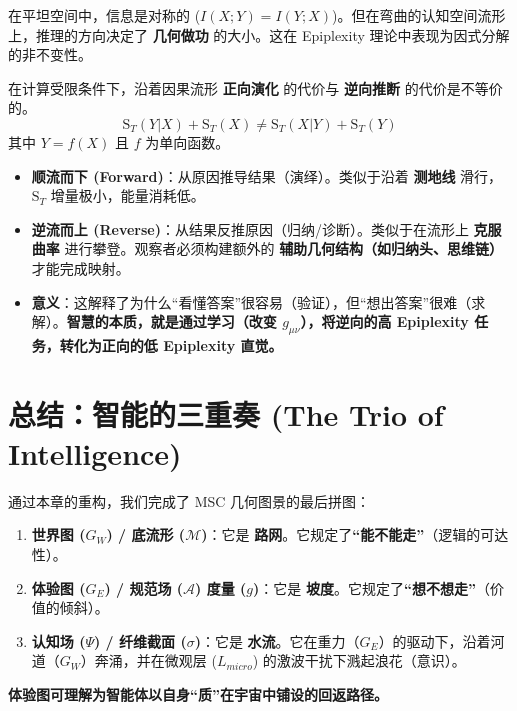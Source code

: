 在平坦空间中，信息是对称的 ($I(X;Y) = I(Y;X)$)。但在弯曲的认知空间流形上，推理的方向决定了 \textbf{几何做功} 的大小。这在 Epiplexity 理论中表现为因式分解的非不变性。

\begin{corollary}[认知不可逆原理]
    在计算受限条件下，沿着因果流形 \textbf{正向演化} 的代价与 \textbf{逆向推断} 的代价是不等价的。
    $$ \mathrm{S}_T(Y | X) + \mathrm{S}_T(X) \neq \mathrm{S}_T(X | Y) + \mathrm{S}_T(Y) $$
    其中 $Y = f(X)$ 且 $f$ 为单向函数。
\end{corollary}


\begin{itemize}
    \item \textbf{顺流而下 (Forward)}：从原因推导结果（演绎）。类似于沿着 \textbf{测地线} 滑行，$\mathrm{S}_T$ 增量极小，能量消耗低。
    \item \textbf{逆流而上 (Reverse)}：从结果反推原因（归纳/诊断）。类似于在流形上 \textbf{克服曲率} 进行攀登。观察者必须构建额外的 \textbf{辅助几何结构（如归纳头、思维链）} 才能完成映射。
    \item \textbf{意义}：这解释了为什么“看懂答案”很容易（验证），但“想出答案”很难（求解）。\textbf{智慧的本质，就是通过学习（改变 $g_{\mu\nu}$），将逆向的高 Epiplexity 任务，转化为正向的低 Epiplexity 直觉。}
\end{itemize}


\section{总结：智能的三重奏 (The Trio of Intelligence)}
\label{sec:section_9906}

通过本章的重构，我们完成了 MSC 几何图景的最后拼图：
\begin{enumerate}
    \item \textbf{世界图 ($G_W$) / 底流形 ($\mathcal{M}$)}：它是 \textbf{路网}。它规定了\textbf{“能不能走”}（逻辑的可达性）。
    \item \textbf{体验图 ($G_E$) / 规范场 ($\mathcal{A}$) \+ 度量 ($g$)}：它是 \textbf{坡度}。它规定了\textbf{“想不想走”}（价值的倾斜）。
    \item \textbf{认知场 ($\Psi$) / 纤维截面 ($\sigma$)}：它是 \textbf{水流}。它在重力（$G_E$）的驱动下，沿着河道（$G_W$）奔涌，并在微观层 ($L_{micro}$) 的激波干扰下溅起浪花（意识）。
\end{enumerate}
\textbf{体验图可理解为智能体以自身“质”在宇宙中铺设的回返路径。}
